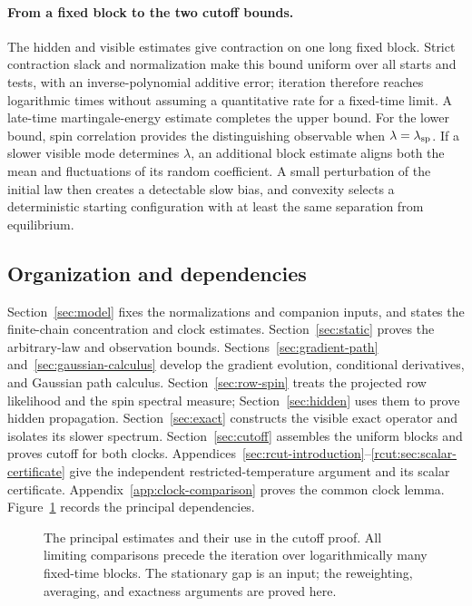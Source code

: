 \paragraph{From a fixed block to the two cutoff bounds.}
The hidden and visible estimates give contraction on one long fixed
block. Strict contraction slack and normalization make this bound uniform
over all starts and tests, with an inverse-polynomial additive error;
iteration therefore reaches logarithmic times without assuming a
quantitative rate for a fixed-time limit. A late-time martingale-energy
estimate completes the upper bound. For the lower bound, spin correlation
provides the distinguishing observable when
\(\lambda=\lambda_{\rm sp}\). If a slower visible mode determines
\(\lambda\), an additional block estimate aligns both the mean and
fluctuations of its random coefficient. A small perturbation of the
initial law then creates a detectable slow bias, and convexity selects
a deterministic starting configuration with at least the same
separation from equilibrium.

\subsection{Organization and dependencies}

Section~\ref{sec:model} fixes the normalizations and companion inputs,
and states the finite-chain concentration and clock estimates.
Section~\ref{sec:static} proves the arbitrary-law and observation bounds.
Sections~\ref{sec:gradient-path} and~\ref{sec:gaussian-calculus} develop
the gradient evolution, conditional derivatives, and Gaussian path
calculus. Section~\ref{sec:row-spin} treats the projected row likelihood
and the spin spectral measure; Section~\ref{sec:hidden} uses them to
prove hidden propagation. Section~\ref{sec:exact} constructs the visible
exact operator and isolates its slower spectrum. Section~\ref{sec:cutoff}
assembles the uniform blocks and proves cutoff for both clocks.
Appendices~\ref{sec:rcut-introduction}--\ref{rcut:sec:scalar-certificate}
give the independent restricted-temperature argument and its scalar
certificate. Appendix~\ref{app:clock-comparison} proves the common
clock lemma. Figure~\ref{fig:proof-dependencies} records the principal
dependencies.

\begin{figure}[htbp]
\centering

\caption{The principal estimates and their use in the cutoff proof.
All limiting comparisons precede the iteration over logarithmically
many fixed-time blocks. The stationary gap is an input; the
reweighting, averaging, and exactness arguments are proved here.}
\label{fig:proof-dependencies}
\end{figure}
